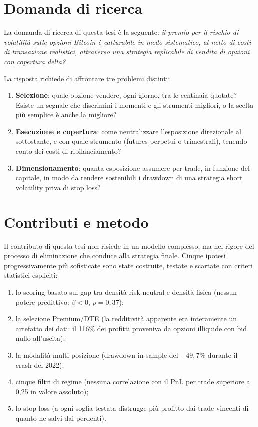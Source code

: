 \section{Domanda di ricerca}
\label{sec:intro-research-question}

La domanda di ricerca di questa tesi è la seguente: \emph{il premio per il
rischio di volatilità sulle opzioni Bitcoin è catturabile in modo
sistematico, al netto di costi di transazione realistici, attraverso una
strategia replicabile di vendita di opzioni con copertura delta?}

La risposta richiede di affrontare tre problemi distinti:

\begin{enumerate}
\item \textbf{Selezione}: quale opzione vendere, ogni giorno, tra le
centinaia quotate? Esiste un segnale che discrimini i momenti e gli
strumenti migliori, o la scelta più semplice è anche la migliore?
\item \textbf{Esecuzione e copertura}: come neutralizzare l'esposizione
direzionale al sottostante, e con quale strumento (futures perpetui o
trimestrali), tenendo conto dei costi di ribilanciamento?
\item \textbf{Dimensionamento}: quanta esposizione assumere per trade, in
funzione del capitale, in modo da rendere sostenibili i drawdown di una
strategia short volatility priva di stop loss?
\end{enumerate}

\section{Contributi e metodo}
\label{sec:intro-contributi}

Il contributo di questa tesi non risiede in un modello complesso, ma nel
rigore del processo di eliminazione che conduce alla strategia finale.
Cinque ipotesi progressivamente più sofisticate sono state costruite,
testate e scartate con criteri statistici espliciti:

\begin{enumerate}
\item lo scoring basato sul gap tra densità risk-neutral e densità fisica
(nessun potere predittivo: $\beta < 0$, $p = 0{,}37$);
\item la selezione Premium/DTE (la redditività apparente era interamente
un artefatto dei dati: il 116\% dei profitti proveniva da opzioni illiquide
con bid nullo all'uscita);
\item la modalità multi-posizione (drawdown in-sample del $-49{,}7\%$
durante il crash del 2022);
\item cinque filtri di regime (nessuna correlazione con il PnL per trade
superiore a 0,25 in valore assoluto);
\item lo stop loss (a ogni soglia testata distrugge più profitto dai
trade vincenti di quanto ne salvi dai perdenti).
\end{enumerate}

